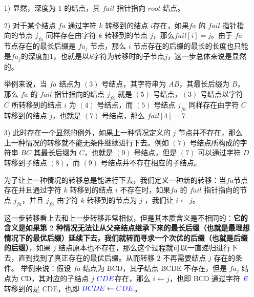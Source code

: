 \documentclass[UTF8]{ctexart}
\begin{document}
\begin{itemize}
  \item [1)] 显然，深度为 $1$ 的结点，其 $fail$ 指针指向 $root$ 结点。
  \item [2)] 对于某个结点 $fa$ 通过字符 $k$ 转移到的结点 $i$存在，如果$fa$ 的 $fail$ 指针指向的节点 $j_{fa}$ 同样存在由字符 $k$ 转移到的节点 $j$，那么$fail[i]=j$。由于 $fa$ 节点存在的最长后缀是 $fa_j$ 节点，那么 $i$ 节点存在的后缀的最长的长度也只能是$fa_j$的深度加$1$，也就是以$k$字符为转移时的子节点$j$，这一步总体来说是显然的。 \par
	举例来说，当 $fa$ 结点为 \textcolor[rgb]{0,0,1}{$(3)$} 号结点，其字符串为 \textcolor[rgb]{1,0,0}{$AB$}，其最长后缀为 \textcolor[rgb]{1,0,0}{$B$}，那么 $fa$ 的 $fail$ 指针指向的结点 $j_{fa}$ 就是 \textcolor[rgb]{0,0,1}{$(5)$} 号结点，\textcolor[rgb]{0,0,1}{$(3)$} 号结点以字符 \textcolor[rgb]{1,0,0}{$C$} 所转移到的结点 $i$ 为 \textcolor[rgb]{0,0,1}{$(4)$} 号结点，而 \textcolor[rgb]{0,0,1}{$(5)$} 号结点 $j_{fa}$ 同样存在由字符 \textcolor[rgb]{1,0,0}{$C$} 转移到的结点 $j$，也就是 \textcolor[rgb]{0,0,1}{$(7)$} 号结点，那么 $fail[4] = 7$
  \item [3)] 此时存在一个显然的例外，如果上一种情况定义的 $j$ 节点并不存在，那么上一种情况的转移就不能无条件继续进行下去。例如 \textcolor[rgb]{0,0,1}{$(7)$} 号结点所构成的字符串 \textcolor[rgb]{1,0,0}{$BC$} 其最长后缀为 \textcolor[rgb]{1,0,0}{$C$}，也就是 \textcolor[rgb]{0,0,1}{$(9)$} 号结点，但是 \textcolor[rgb]{0,0,1}{$(7)$} 可以通过字符 \textcolor[rgb]{1,0,0}{$D$} 转移到子结点 \textcolor[rgb]{0,0,1}{$(8)$}，而 \textcolor[rgb]{0,0,1}{$(9)$} 号结点并不存在相应的子结点。 \par
为了让上一种情况的转移总是能进行下去，我们定义一种新的转移：当$fa$节点存在并且通过字符 $k$ 转移到的结点 $i$ 不存在时，如果$fa$ 的 $fail$ 指针指向的节点 $j_{fa}$，并且 $j_{fa}$ 由字符 $k$ 转移到的节点为 $j$ ，我们让 $i \gets j$。\par 
	这一步转移看上去和上一步转移非常相似，但是其本质含义是不相同的：\textbf{它的含义是如果第 $2$ 种情况无法让从父亲结点继承下来的最长后缀（也就是最理想情况下的最优后缀）延续下去，我们就转而寻求一个次优的后缀（也就是后缀的后缀）}，如果 $j$ 结点原本也不存在，那么这个过程就可以一直递归进行下去，直到找到了真正存在的最优后缀。从而转移 $2$ 不再需要结点 $j$ 存在的条件。
	举例来说：假设 $fa$ 结点为 \textcolor[rgb]{0,0,1}{BCD}，其子结点 \textcolor[rgb]{0,0,1}{BCDE} 不存在，但是 $fa_j$ 结点为 \textcolor[rgb]{0,0,1}{CD}，其对应的子结点 $j$ $\textcolor[rgb]{0,0,1}{CDE}$存在，那么 $i \gets j$，也即 \textcolor[rgb]{0,0,1}{BCD} 通过字符 $\textcolor[rgb]{0,0,1}{E}$ 转移到的是 \textcolor[rgb]{0,0,1}{CDE}，也即 $ \textcolor[rgb]{0,0,1}{BCDE}  \gets  \textcolor[rgb]{0,0,1}{CDE}$。 \par

\end{itemize}
\end{document}
